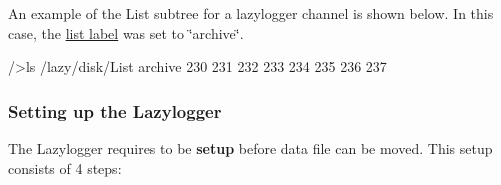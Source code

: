 An example of the List subtree for a lazylogger channel is shown below. In this case, the \hyperlink{F_LogUtil_F_Lazy_list_label}{list label} was set to \char`\"{}archive\char`\"{}.


\begin{DoxyCode}
/>ls /lazy/disk/List
archive
                                230
                                231
                                232
                                233
                                234
                                235
                                236
                                237
\end{DoxyCode}


\par


\par
\hypertarget{F_LogUtil_F_ODB_Lazy_setup}{}\subsubsection{Setting up the Lazylogger}\label{F_LogUtil_F_ODB_Lazy_setup}
The Lazylogger requires to be {\bfseries setup} before data file can be moved. This setup consists of 4 steps:


